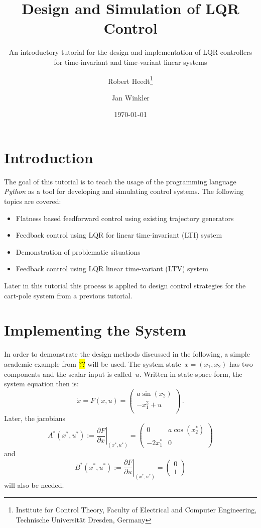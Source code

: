 \documentclass[a4paper,11pt,headinclude=true,headsepline,parskip=half,DIV=13]{scrartcl}
\title{Design and Simulation of LQR Control}
\subtitle{An introductory tutorial for the design and implementation of LQR controllers for time-invariant and time-variant linear systems}
\author{Robert Heedt\thanks{Institute for Control Theory, Faculty of Electrical and Computer Engineering, Technische Universität Dresden, Germany} \and Jan Winkler\footnotemark[1]}
\date{\today}
\newcommand{\py}{\emph{Python}\xspace}
\begin{document}
\maketitle




\tableofcontents

\newpage

\section{Introduction}
The goal of this tutorial is to teach the usage of the programming language \py as a tool for developing and simulating control systems.
The following topics are covered:
\begin{itemize}
    \item Flatness based feedforward control using existing trajectory generators
    \item Feedback control using LQR for linear time-invariant (LTI) system
    \item Demonstration of problematic situations
    \item Feedback control using LQR linear time-variant (LTV) system
\end{itemize}
Later in this tutorial this process is applied to design control strategies for the cart-pole system from a previous tutorial.

\section{Implementing the System}
In order to demonstrate the design methods discussed in the following, a simple academic example from \hl{??} will be used.
The system state~$x=(x_1, x_2)$ has two components and the scalar input is called~$u$.
Written in state-space-form, the system equation then is:
\begin{equation}
\dot x = F(x, u) = 
\begin{pmatrix}
a \sin(x_2)\\
-x_1^2+u\\
\end{pmatrix}\,.
\label{eq:academic_example_ss}
\end{equation}
Later, the jacobians
\begin{equation}
A^*(x^*, u^*) := \left.\frac{\partial F}{\partial x}\right\vert_{(x^*, u^*)}= \begin{pmatrix}0 & a \cos(x^*_2)\\-2 x^*_1 & 0\end{pmatrix}
\label{eq:jac_A}
\end{equation}
and
\begin{equation}
B^*(x^*, u^*) := \left.\frac{\partial F}{\partial u}\right\vert_{(x^*, u^*)}= \begin{pmatrix}0 \\ 1\end{pmatrix}
\label{eq:jac_B}
\end{equation}
will also be needed.
\end{document}
